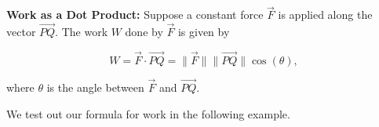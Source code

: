 \documentclass{ximera}
\begin{document}
\begin{theorem} \label{workthm} \textbf{Work as a Dot Product:}  Suppose a constant force $\overrightarrow{F}$ is applied along the vector $\overrightarrow{PQ}$.  The work $W$ done by $\overrightarrow{F}$ is given by

\[ W = \overrightarrow{F} \cdot \overrightarrow{PQ}  = \| \overrightarrow{F} \| \| \overrightarrow{PQ} \| \cos(\theta),\]

where $\theta$ is the angle between $\overrightarrow{F}$ and $\overrightarrow{PQ}$.

\end{theorem}


 

We test out our formula for work in the following example.

 
\end{document}
